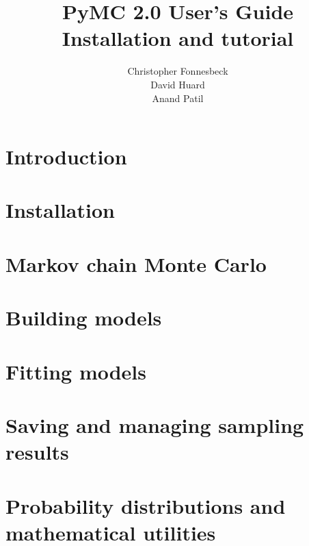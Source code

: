 \documentclass[]{manual}
\title{PyMC 2.0 User's Guide \\
Installation and tutorial}
\author{ Christopher Fonnesbeck\\ David Huard \\ Anand Patil }
\begin{document}
\maketitle

\tableofcontents

\chapter{Introduction} 
\label{chap:intro} 


\chapter{Installation} 
\label{chap:install} 


\chapter{Markov chain Monte Carlo} 
\label{chap:MCMC} 


\chapter{Building models}
\label{chap:modelbuilding} 


\chapter{Fitting models}
\label{chap:modelfitting}


\chapter{Saving and managing sampling results}
\label{chap:database} 


\chapter{Probability distributions and mathematical utilities} 
\label{chap:distributions}




\end{document}
